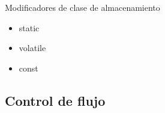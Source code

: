 \documentclass[aspectratio=169]{beamer}
\begin{document}
\begin{frame}{Modificadores de clase de almacenamiento}
	\begin{itemize}
		\item static
		\vspace{5px}
		\item volatile
		\vspace{5px}
		\item const
	\end{itemize}
\end{frame}

\subsection{Control de flujo}



%
%
%
%
\end{document}

